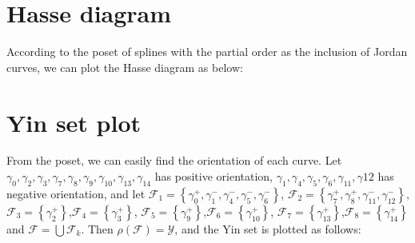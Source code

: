 \documentclass[]{article}
\begin{document}
\section{Hasse diagram}
According to the poset of splines with the partial order as the inclusion of Jordan curves, 
we can plot the Hasse diagram as below:\\



\section{Yin set plot}
From the poset, we can easily find the orientation of each curve. 
Let $\gamma_0,\gamma_2,\gamma_3,\gamma_7,\gamma_8,\gamma_9,\gamma_{10},\gamma_{13},\gamma_{14}$ has positive orientation, 
$\gamma_1,\gamma_4,\gamma_5,\gamma_6,\gamma_{11},\gamma{12}$ has negative orientation, and
let $\mathcal{F}_1 = \left\{ \gamma_0^+,\gamma_1^-,\gamma_4^-,\gamma_5^-,\gamma_6^- \right\} $,
$\mathcal{F}_2 = \left\{ \gamma_7^+,\gamma_8^+,\gamma_{11}^-,\gamma_{12}^- \right\}$,
$\mathcal{F}_3 = \left\{\gamma_2^+\right\} $,$\mathcal{F}_4 = \left\{\gamma_3^+\right\} $,
$\mathcal{F}_5 = \left\{\gamma_9^+\right\} $,$\mathcal{F}_6 = \left\{\gamma_{10}^+\right\} $,
$\mathcal{F}_7 = \left\{\gamma_{13}^+\right\} $,$\mathcal{F}_8 = \left\{\gamma_{14}^+\right\} $\\
 and $\mathcal{F} = \bigcup \mathcal{F}_k $. Then $\rho(\mathcal{F}) = \mathcal{Y} $, and the Yin set is plotted as follows:\\
\end{document}
